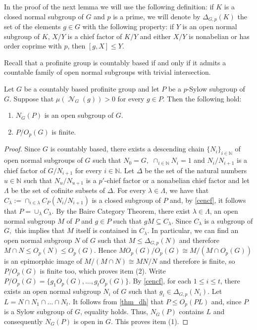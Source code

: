 \documentclass{amsart}
\DeclareMathOperator{\nil}{\mathcal N}
\numberwithin{equation}{section}
\begin{document}
In the proof of the next lemma we will use the following definition: if $K$ is a closed normal subgroup of $G$ and $p$ is a prime, we will denote by $\Delta_{G,p}(K)$ the set of the elements $g\in G$ with the following property: if $Y$ is an open normal subgroup of $K$, $X/Y$ is a chief factor of $K/Y$
and either $X/Y$ is nonabelian or has order coprime with $p$, then $[g,X]\leq Y.$

Recall that a profinite group is countably based if and only if it admits a countable family of open normal subgroups with trivial intersection.

\begin{lemma}\label{nilpel}
	Let $G$ be a countably based profinite group and let $P$ be a $p$-Sylow subgroup of $G.$  Suppose that $\mu(\nil_G(g))>0$ for every $g\in P.$
    Then the following hold:
    \begin{enumerate}
    \item $N_G(P)$ is an open subgroup of $G.$
    \item $P/O_p(G)$ is finite.
    \end{enumerate}
\end{lemma}
\begin{proof}
Since $G$ is countably based, there exists a descending chain  $\{N_i\}_{i\in \mathbb N}$ of open normal subgroups of $G$ such that $N_0=G,$  $\cap_{i\in \mathbb N}N_i=1$ and $N_i/N_{i+1}$ is a chief factor of $G/N_{i+1}$ for every $i\in \mathbb N.$    
Let $\Delta$ be the set of the natural numbers $u \in \mathbb{N}$ such that $N_{u}/N_{u+1}$ is a $p'$-chief factor or a nonabelian chief factor and let $\Lambda$ be the set of cofinite subsets of $\Delta$. For every $\lambda \in \Lambda$, we have that $C_\lambda := \cap_{i \in \lambda} C_P(N_i/N_{i+1})$ is a closed subgroup of $P$ and, by \cref{cencf}, it follows that $P= \cup_\lambda C_\lambda$. By the Baire Category Theorem, there exist $\lambda \in \Lambda$, an open normal subgroup $M$ of $P$ and $g \in P$ such that $gM \subseteq C_\lambda$. Since $C_\lambda$ is a subgroup of $G,$ this implies that $M$ itself is contained in $C_\lambda$. In particular, we can find an open normal subgroup $N$ of $G$ such that $M \leq \Delta_{G,p}(N)$ and therefore $M\cap N\leq O_p(N)\leq O_p(G).$ Hence $MO_p(G)/O_p(G)\cong M/(M\cap O_p(G))$ is an epimorphic image of 
$M/(M \cap N) \cong MN/N$ and therefore is finite, so $P/O_p(G)$ is finite too, which proves item (2). Write $P/O_p(G)=\{g_1O_p(G), \ldots, g_tO_p(G)\}$. By  \cref{cencf}, for each $1\leq i\leq t$, there exists an open normal subgroup $N_i$ of $G$ such that $g_i \in \Delta_{G,p}(N_i)$. Let $L = N \cap N_1 \cap \dots \cap N_t.$ It follows from \cref{thm_dh} that $P \leq O_p(PL)$ and, since $P$ is a Sylow subgroup of $G$, equality holds. Thus, $N_G(P)$ contains $L$ and consequently $N_G(P)$ is open in $G.$ This proves item (1).
\end{proof}
\end{document}
